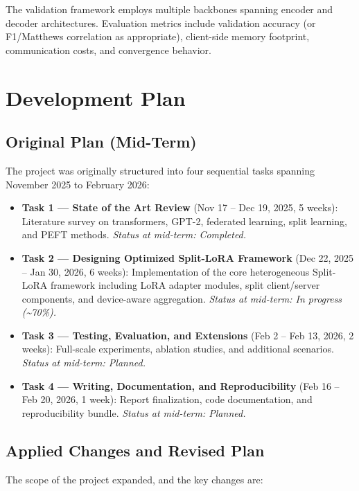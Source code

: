 \documentclass[11pt,a4paper]{article}
\begin{document}
The validation framework employs multiple backbones spanning encoder and decoder architectures. Evaluation metrics include validation accuracy (or F1/Matthews correlation as appropriate), client-side memory footprint, communication costs, and convergence behavior.

\section{Development Plan}

\subsection{Original Plan (Mid-Term)}

The project was originally structured into four sequential tasks spanning November 2025 to February 2026:

\begin{itemize}
\item \textbf{Task 1 --- State of the Art Review} (Nov 17 -- Dec 19, 2025, 5 weeks): Literature survey on transformers, GPT-2, federated learning, split learning, and PEFT methods. \emph{Status at mid-term: Completed.}
\item \textbf{Task 2 --- Designing Optimized Split-LoRA Framework} (Dec 22, 2025 -- Jan 30, 2026, 6 weeks): Implementation of the core heterogeneous Split-LoRA framework including LoRA adapter modules, split client/server components, and device-aware aggregation. \emph{Status at mid-term: In progress (\textasciitilde70\%).}
\item \textbf{Task 3 --- Testing, Evaluation, and Extensions} (Feb 2 -- Feb 13, 2026, 2 weeks): Full-scale experiments, ablation studies, and additional scenarios. \emph{Status at mid-term: Planned.}
\item \textbf{Task 4 --- Writing, Documentation, and Reproducibility} (Feb 16 -- Feb 20, 2026, 1 week): Report finalization, code documentation, and reproducibility bundle. \emph{Status at mid-term: Planned.}
\end{itemize}

\subsection{Applied Changes and Revised Plan}

The scope of the project expanded, and the key changes are:
\end{document}
